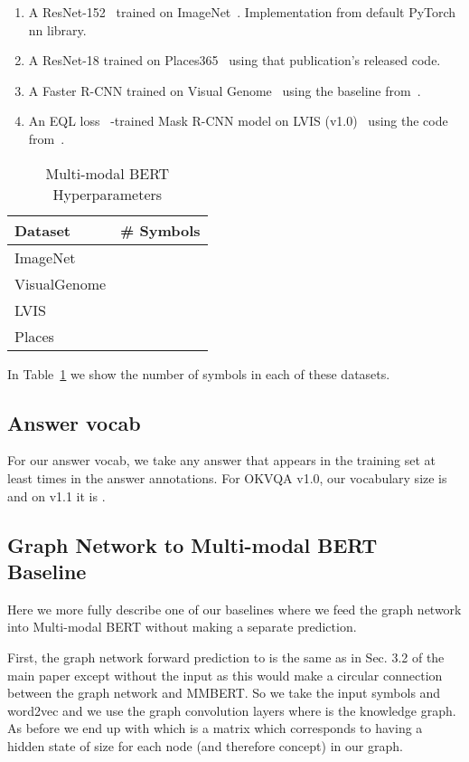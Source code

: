 \documentclass[final]{cvpr}
\providecommand{\MMBERTBase}{Multi-modal BERT\xspace}
\providecommand{\MMBERTAbr}{MMBERT\xspace}
\begin{document}
\begin{enumerate}
    \item A ResNet-152~\cite{he2016deep} trained on ImageNet~\cite{ILSVRC15}. Implementation from default PyTorch~\cite{paszke2019pytorch} nn library.
    \item A ResNet-18 trained on Places365~\cite{zhou2017places} using that publication's released code. 
    \item A Faster R-CNN trained on Visual Genome~\cite{krishnavisualgenome} using the baseline from~\cite{jiang2020defense}.
    \item An EQL loss~\cite{tan2020equalization} -trained Mask R-CNN model on LVIS (v1.0)~\cite{gupta2019lvis} using the code from~\cite{tan2020equalization}.
\end{enumerate}

\begin{table}[h]
\begin{center}
\begin{tabular}{@{}lc@{}}
\toprule
Dataset & \# Symbols\\ \midrule
ImageNet&  \\
VisualGenome &  \\
LVIS &  \\
Places &  \\
\bottomrule
\end{tabular}
\end{center}
\caption{\MMBERTBase Hyperparameters}
\label{table:datasetsize}
\end{table}

In Table~\ref{table:datasetsize} we show the number of symbols in each of these datasets.


\subsection{Answer vocab}
\label{appx:ansvocab}
For our answer vocab, we take any answer that appears in the training set at least  times in the answer annotations. For OKVQA v1.0, our vocabulary size is  and on v1.1 it is .

\subsection{Graph Network to \MMBERTBase Baseline}
\label{appx:gntovbbaseline}
Here we more fully describe one of our baselines where we feed the graph network into \MMBERTBase without making a separate prediction.

First, the graph network forward prediction to  is the same as in Sec. 3.2 of the main paper except without the  input as this would make a circular connection between the graph network and \MMBERTAbr. So we take the input symbols and word2vec and we use the graph convolution layers  where  is the knowledge graph. As before we end up with  which is a  matrix which corresponds to having a hidden state of size  for each node (and therefore concept) in our graph.
\end{document}
